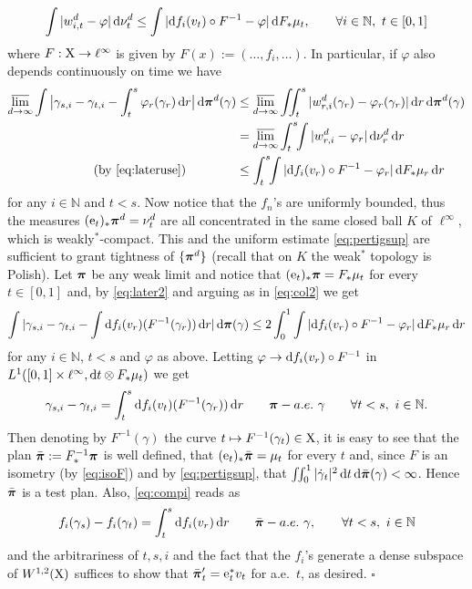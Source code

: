 \documentclass[11pt]{article}
\numberwithin{equation}{section}
\newenvironment{idea}{\removelastskip\par\medskip   %
\noindent{\em Idea of the proof} \rm}{\penalty-20\null\hfill$\square$\par\medbreak}
\newcommand{\N}{\mathbb{N}}
\newcommand{\ppi}{{\mbox{\boldmath$\pi$}}}
\newcommand{\e}{{\rm e}}
\newcommand{\X}{{\rm X}}
\renewcommand{\d}{{\rm d}}
\newcommand{\lims}{\varlimsup}
\begin{document}
\begin{idea}
\begin{equation}
\label{eq:lateruse}
\int |w^d_{i,t} -\varphi |\,\d\nu^d_t\leq \int|\d f_i(v_t)\circ F^{-1}-\varphi |\,\d F_*\mu_t,\qquad\forall i\in\N,\ t\in[0,1]
\end{equation}
where $F:\X\to \ell^\infty$ is given by  $F(x):=(\ldots,f_i,\ldots)$. In particular, if $\varphi$ also depends continuously on time we have
\begin{equation}
\label{eq:later2}
\begin{split}
\lims_{d\to\infty}\int\big|\gamma_{s,i}-\gamma_{t,i}-\int_t^s\varphi_r(\gamma_r)\,\d r\big|\,\d\ppi^d(\gamma)&\leq \lims_{d\to \infty}\iint_t^s|w^d_{r,i}(\gamma_r)-\varphi_r(\gamma_r)|\,\d r\,\d\ppi^d(\gamma)\\
&=\lims_{d\to\infty} \int_t^s\!\!\int|w^d_{r,i}-\varphi_r|\,\d\nu^d_r\,\d r\\
\text{(by \eqref{eq:lateruse})}\qquad\qquad&\leq \int_t^s\!\!\int|\d f_i(v_r)\circ F^{-1}-\varphi_r|\,\d F_*\mu_r\,\d r
\end{split}
\end{equation}
for any $i\in\N$ and $t<s$. Now notice that  the $f_n$'s are uniformly bounded, thus  the measures $(\e_t)_*\ppi^d=\nu^d_t$ are all  concentrated in the same closed ball $K$ of $\ell^\infty$, which is  weakly$^*$-compact. This and the uniform estimate \eqref{eq:pertigsup} are sufficient to grant tightness of $\{\ppi^d\}$ (recall that on $K$ the weak$^*$ topology is Polish). Let $\ppi$ be  any weak limit and notice that $(\e_t)_*\ppi=F_*\mu_t$ for every $t\in[0,1]$ and, by \eqref{eq:later2} and arguing as in   \eqref{eq:col2} we get
\[
\int |\gamma_{s,i}-\gamma_{t,i}-\int \d f_i(v_r)(F^{-1}(\gamma_r))\,\d r|\,\d\ppi(\gamma)\leq 2 \int_0^1\int|\d f_i(v_r)\circ F^{-1}-\varphi_r|\,\d F_*\mu_r\,\d r
\]
for any $i\in\N$, $t<s$ and $\varphi$ as above. Letting $\varphi\to \d f_i(v_r)\circ F^{-1}$ in $L^1([0,1]\times\ell^\infty,\d t\otimes F_*\mu_t)$ we get
\begin{equation}
\label{eq:compi}
\gamma_{s,i}-\gamma_{t,i}=\int_t^s\d f_i(v_t)(F^{-1}(\gamma_r))\,\d r\qquad \ppi-a.e.\ \gamma\qquad\forall t<s,\ i\in\N.
\end{equation}
Then denoting by $F^{-1}(\gamma)$ the curve $t\mapsto F^{-1}(\gamma_t)\in\X$, it is easy to see that the plan $\bar\ppi:=F^{-1}_*\ppi$ is well defined, that $(\e_t)_*\bar\ppi=\mu_t$ for every $t$ and, since $F$ is an isometry (by \eqref{eq:isoF}) and by \eqref{eq:pertigsup}, that $\iint_0^1|\dot\gamma_t|^2\,\d t\,\d\bar\ppi(\gamma)<\infty$. Hence $\bar\ppi$ is a test plan. Also, \eqref{eq:compi} reads as
\[
f_i(\gamma_s)-f_i(\gamma_t)=\int_t^s\d f_i(v_r)\,\d r\qquad\bar\ppi-a.e.\ \gamma,\qquad\forall t<s,\ i\in\N
\]
and the arbitrariness of $t,s,i$ and the fact that the $f_i$'s generate a dense subspace of $W^{1,2}(\X)$ suffices to show that $\bar\ppi'_t=\e_t^*v_t$ for a.e.\ $t$, as desired.
\end{idea}
\end{document}
